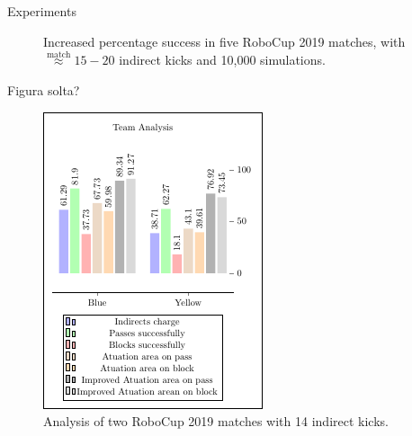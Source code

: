 \documentclass[xcolor=svgnames,8pt]{beamer}
\newcommand{\approxtext}[1]{\ensuremath{\stackrel{\text{#1}}{\approx}}}
\begin{document}
\begin{frame}{Experiments}
\begin{figure}[h]
\begin{adjustbox}{width=.45\textwidth}
            \end{adjustbox}
            \caption{Increased percentage success in five RoboCup 2019 matches, with $\approxtext{match} 15-20$ indirect kicks and 10,000 simulations.}
            \label{fig:match}
            \end{figure}
    
    \end{frame}


    \begin{frame}{Figura solta?}
        \begin{figure}[ht]
        \centering
        \begin{adjustbox}{width=.40\linewidth}
            \includegraphics{grafico_team}
        \end{adjustbox}
        \caption{Analysis of two RoboCup 2019 matches with 14 indirect kicks.}
        \label{fig:analysis_match}
        \end{figure}   
    \end{frame}
\end{document}
